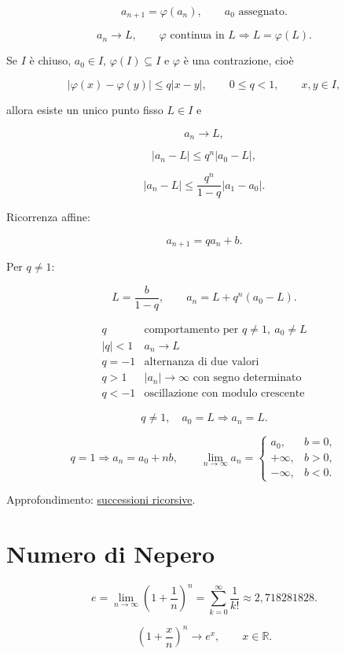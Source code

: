 \[
a_{n+1}=\varphi(a_n),
\qquad a_0\text{ assegnato}.
\]

\[
a_n\to L,
\qquad
\varphi\text{ continua in }L
\Longrightarrow
L=\varphi(L).
\]

Se \(I\) è chiuso, \(a_0\in I\), \(\varphi(I)\subseteq I\) e \(\varphi\) è una contrazione, cioè

\[
|\varphi(x)-\varphi(y)|\le q|x-y|,
\qquad
0\le q<1,
\qquad x,y\in I,
\]

allora esiste un unico punto fisso \(L\in I\) e

\[
a_n\to L,
\]

\[
|a_n-L|\le q^n|a_0-L|,
\]

\[
|a_n-L|\le\frac{q^n}{1-q}|a_1-a_0|.
\]

Ricorrenza affine:

\[
a_{n+1}=qa_n+b.
\]

Per \(q\ne1\):

\[
L=\frac b{1-q},
\qquad
a_n=L+q^n(a_0-L).
\]

\[
\begin{array}{c|c}
q&\text{comportamento per }q\ne1,\ a_0\ne L\\
\hline
|q|<1&a_n\to L\\
q=-1&\text{alternanza di due valori}\\
q>1&|a_n|\to\infty\text{ con segno determinato}\\
q<-1&\text{oscillazione con modulo crescente}
\end{array}
\]

\[
q\ne1,\quad a_0=L
\Longrightarrow
a_n=L.
\]

\[
q=1
\Longrightarrow
a_n=a_0+nb,
\qquad
\lim_{n\to\infty}a_n=
\begin{cases}
a_0,&b=0,\\
+\infty,&b>0,\\
-\infty,&b<0.
\end{cases}
\]

Approfondimento: \href{https://ingegnerismo.it/matematica/successioni-ricorsive/}{successioni ricorsive}.

\section{Numero di Nepero}\label{numero-di-nepero}

\[
e=\lim_{n\to\infty}\left(1+\frac1n\right)^n
=\sum_{k=0}^{\infty}\frac1{k!}
\approx2{,}718281828.
\]

\[
\left(1+\frac xn\right)^n\to e^x,
\qquad x\in\mathbb R.
\]

